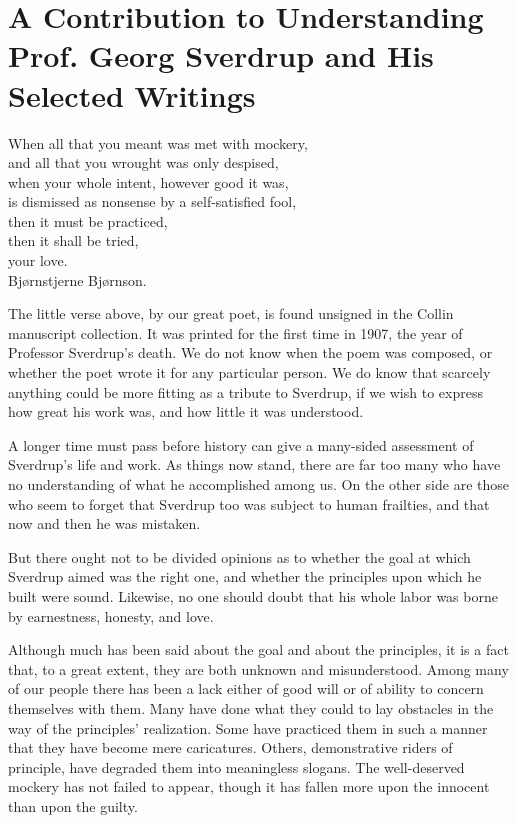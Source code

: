 \section{A Contribution to Understanding Prof. Georg Sverdrup and His Selected Writings}

\begin{center}
\begin{minipage}{0.7\textwidth}
\centering
When all that you meant was met with mockery,\\
and all that you wrought was only despised,\\
when your whole intent, however good it was,\\
is dismissed as nonsense by a self-satisfied fool,\\
then it must be practiced,\\
then it shall be tried,\\
your love.\\[0.5em]
Bjørnstjerne Bjørnson.
\end{minipage}
\end{center}

The little verse above, by our great poet, is found unsigned in the Collin manuscript collection. It was printed for the first time in 1907, the year of Professor Sverdrup’s death. We do not know when the poem was composed, or whether the poet wrote it for any particular person. We do know that scarcely anything could be more fitting as a tribute to Sverdrup, if we wish to express how great his work was, and how little it was understood.

A longer time must pass before history can give a many-sided assessment of Sverdrup’s life and work. As things now stand, there are far too many who have no understanding of what he accomplished among us. On the other side are those who seem to forget that Sverdrup too was subject to human frailties, and that now and then he was mistaken.

But there ought not to be divided opinions as to whether the goal at which Sverdrup aimed was the right one, and whether the principles upon which he built were sound. Likewise, no one should doubt that his whole labor was borne by earnestness, honesty, and love.

Although much has been said about the goal and about the principles, it is a fact that, to a great extent, they are both unknown and misunderstood. Among many of our people there has been a lack either of good will or of ability to concern themselves with them. Many have done what they could to lay obstacles in the way of the principles’ realization. Some have practiced them in such a manner that they have become mere caricatures. Others, demonstrative riders of principle, have degraded them into meaningless slogans. The well-deserved mockery has not failed to appear, though it has fallen more upon the innocent than upon the guilty.

